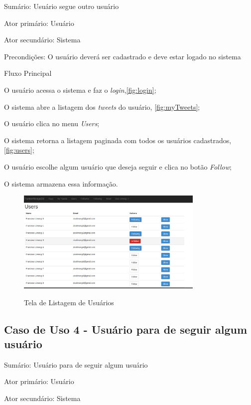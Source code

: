 Sumário: Usuário segue outro usuário

Ator primário: Usuário

Ator secundário: Sistema

Precondições: O usuário deverá ser cadastrado e deve estar logado no sistema

Fluxo Principal
\begin{enumerate}
{\setlength\itemindent{25pt}
\item O usuário acessa o sistema e faz o \textit{login},\autoref{fig:login};
\item O sistema abre a listagem dos \textit{tweets} do usuário, \autoref{fig:myTweets};
\item O usuário clica no menu \textit{Users};
\item O sistema retorna a listagem paginada com todos os usuários cadastrados, \autoref{fig:users};
\item O usuário escolhe algum usuário que deseja seguir e clica no botão \textit{Follow};
\item O sistema armazena essa informação.
}
\end{enumerate}

\begin{figure}[H]
    \centering
    \caption{Tela de Listagem de Usuários}
    \includegraphics[width=0.8\textwidth]{./04-figuras/users.png}
    \label{fig:users}
\end{figure}

\subsection{Caso de Uso 4 - Usuário para de seguir algum usuário}
\label{subsec:useCaseUserUnfollow}

Sumário: Usuário para de seguir algum usuário

Ator primário: Usuário

Ator secundário: Sistema

